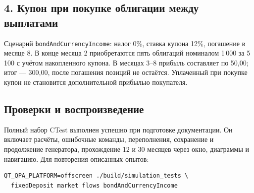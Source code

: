\documentclass[11pt,a4paper]{article}
\newcommand{\code}[1]{\texttt{#1}}
\begin{document}
\subsection*{4. Купон при покупке облигации между выплатами}
Сценарий \code{bondAndCurrencyIncome}: налог 0\%, ставка купона 12\%, погашение в месяце 8. В конце месяца 2 приобретаются пять облигаций номиналом 1\,000 за 5\,100 с учётом накопленного купона. В месяцах 3--8 прибыль составляет по 50,00; итог --- 300,00, после погашения позиций не остаётся. Уплаченный при покупке купон не становится дополнительной прибылью покупателя.

\subsection*{Проверки и воспроизведение}
Полный набор CTest выполнен успешно при подготовке документации. Он включает расчёты, ошибочные команды, переполнения, сохранение и продолжение генератора, прохождение 12 и 30 месяцев через окно, диаграммы и навигацию. Для повторения описанных опытов:
\begin{verbatim}
QT_QPA_PLATFORM=offscreen ./build/simulation_tests \
  fixedDeposit market flows bondAndCurrencyIncome
\end{verbatim}
\end{document}
